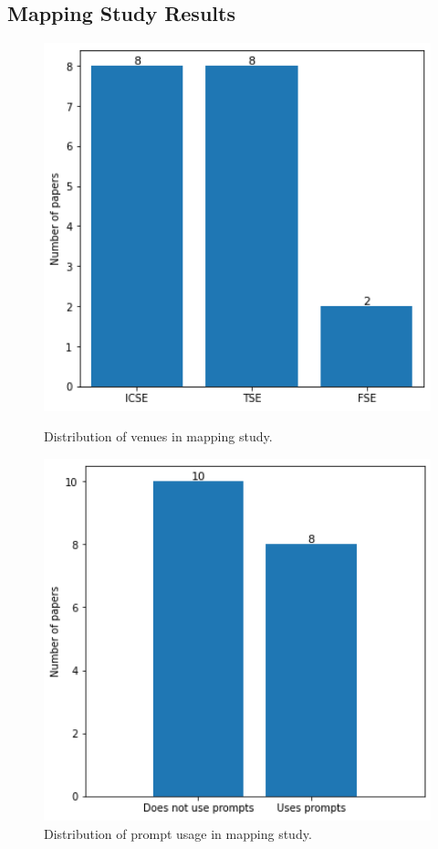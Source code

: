 \documentclass[a4paper]{article}
\begin{document}
\subsection{Mapping Study Results}
\begin{figure}[h]
	\hfill
	\begin{minipage}{0.45\textwidth}
		\includegraphics[width=1\textwidth]{figures/Venues.png}
		\caption{Distribution of venues in mapping study.}
		\label{fig:Venues}
	\end{minipage}
	\hfill
	\begin{minipage}{0.45\textwidth}
		\includegraphics[width=1\textwidth]{figures/Prompts.png}
		\caption{Distribution of prompt usage in mapping study.}
		\label{fig:Prompts}
	\end{minipage}
	\hfill
\end{figure}
\end{document}
